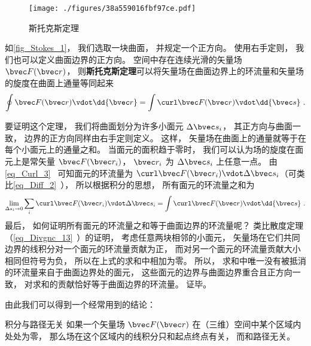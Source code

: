 
\begin{issues}
\issueTODO
\end{issues}


\begin{figure}[ht]
\centering
\texttt{[image: ./figures/38a559016fbf97ce.pdf]}
\caption{斯托克斯定理} \label{fig_Stokes_1}
\end{figure}

如\autoref{fig_Stokes_1}， 我们选取一块曲面， 并规定一个正方向。 使用右手定则， 我们也可以定义曲面边界的正方向。 空间中存在连续光滑的矢量场 $\bvec F(\bvec r)$， 则\textbf{斯托克斯定理}可以将矢量场在曲面边界上的环流量和矢量场的旋度在曲面上通量等同起来
\begin{equation}\label{eq_Stokes_1}
\oint \bvec F(\bvec r) \vdot \dd{\bvec r} = \int \curl \bvec F(\bvec r) \vdot \dd{\bvec s}~.
\end{equation}

要证明这个定理， 我们将曲面划分为许多小面元 $\Delta \bvec s_i$， 其正方向与曲面一致， 边界的正方向同样由右手定则定义。 这样， 矢量场在曲面上的通量就等于在每个小面元上的通量之和。 当面元的面积趋于零时， 我们可以认为场的旋度在面元上是常矢量 $\bvec F(\bvec r_i)$， $\bvec r_i$ 为 $\Delta \bvec s_i$ 上任意一点。 由\autoref{eq_Curl_3}~ 可知面元的环流量为 $\curl\bvec F(\bvec r_i) \vdot \Delta \bvec s_i$（可类比\autoref{eq_Diff_2}~）， 所以根据积分的思想， 所有面元的环流量之和为
\begin{equation}
\lim_{\Delta s_i \to 0}\sum_i \curl\bvec F(\bvec r_i) \vdot \Delta \bvec s_i = \int \curl\bvec F(\bvec r) \vdot \dd{\bvec s}~.
\end{equation}
最后， 如何证明所有面元的环流量之和等于曲面边界的环流量呢？ 类比散度定理（\autoref{eq_Divgnc_13}~）的证明， 考虑任意两块相邻的小面元， 矢量场在它们共同边界的线积分对一个面元的环流量贡献为正， 而对另一个面元的环流量贡献大小相同但符号为负， 所以在上式的求和中相加为零。 所以， 求和中唯一没有被抵消的环流量来自于曲面边界处的面元， 这些面元的边界与曲面边界重合且正方向一致， 对求和的贡献恰好等于曲面边界的环流量。 证毕。

由此我们可以得到一个经常用到的结论：
\begin{theorem}{积分与路径无关}
如果一个矢量场 $\bvec F(\bvec r)$ 在（三维）空间中某个区域内处处为零， 那么场在这个区域内的线积分只和起点终点有关， 而和路径无关。
\end{theorem}

